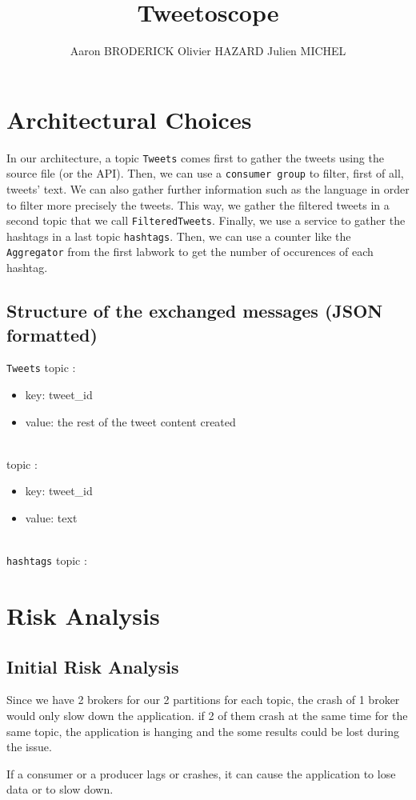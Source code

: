 \documentclass[10pt,a4paper]{article}
\author{Aaron BRODERICK Olivier HAZARD Julien MICHEL}
\title{Tweetoscope}
\begin{document}
\maketitle
\section{Architectural Choices}
\qquad 
In our architecture, a topic \texttt{Tweets} comes first to gather the tweets using the source file (or the API). Then, we can use a \texttt{consumer group} to filter, first of all, tweets' text. We can also gather further information such as the language in order to filter more precisely the tweets. This way, we gather the filtered tweets in a second topic that we call \texttt{FilteredTweets}. Finally, we use a service to gather the hashtags in a last topic \texttt{hashtags}. Then, we can use a counter like the \texttt{Aggregator} from the first labwork to get the number of occurences of each hashtag.

\subsection{Structure of the exchanged messages (JSON formatted)}

\texttt{Tweets} topic :
\begin{itemize}
    \item key: tweet\_id
    \item value: the rest of the tweet content {created}
\end{itemize}
\\
 topic :
\begin{itemize}
    \item key: tweet\_id
    \item value: text
\end{itemize}
\\
\texttt{hashtags} topic :

\section{Risk Analysis}
\subsection{Initial Risk Analysis}
\qquad Since we have 2 brokers for our 2 partitions for each topic, the crash of 1 broker would only slow down the application. if 2 of them crash at the same time for the same topic, the application is hanging and the some results could be lost during the issue.

If a consumer or a producer lags or crashes, it can cause the application to lose data or to slow down.
\end{document}

